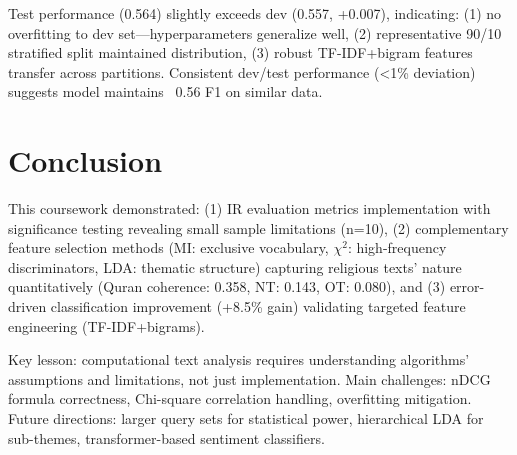 \documentclass[10pt,a4paper]{article}
\begin{document}
Test performance (0.564) slightly exceeds dev (0.557, +0.007), indicating: (1) no overfitting to dev set—hyperparameters generalize well, (2) representative 90/10 stratified split maintained distribution, (3) robust TF-IDF+bigram features transfer across partitions. Consistent dev/test performance (<1\% deviation) suggests model maintains ~0.56 F1 on similar data.

\section{Conclusion}

This coursework demonstrated: (1) IR evaluation metrics implementation with significance testing revealing small sample limitations (n=10), (2) complementary feature selection methods (MI: exclusive vocabulary, $\chi^2$: high-frequency discriminators, LDA: thematic structure) capturing religious texts' nature quantitatively (Quran coherence: 0.358, NT: 0.143, OT: 0.080), and (3) error-driven classification improvement (+8.5\% gain) validating targeted feature engineering (TF-IDF+bigrams).

Key lesson: computational text analysis requires understanding algorithms' assumptions and limitations, not just implementation. Main challenges: nDCG formula correctness, Chi-square correlation handling, overfitting mitigation. Future directions: larger query sets for statistical power, hierarchical LDA for sub-themes, transformer-based sentiment classifiers.
\end{document}
